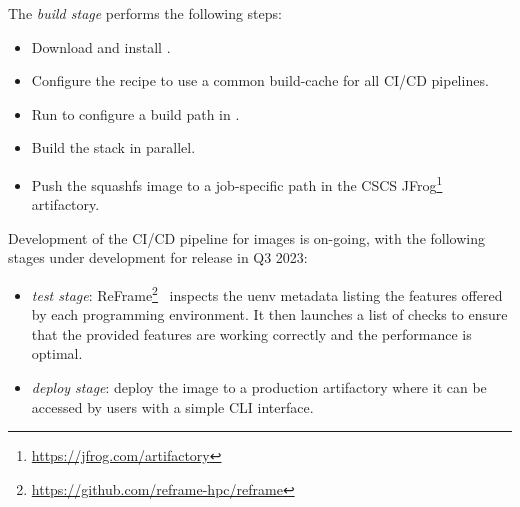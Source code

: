 The \emph{build stage} performs the following steps:
\begin{itemize}
    \item Download and install \stackinator.
    \item Configure the recipe to use a common build-cache for all CI/CD pipelines.
    \item Run \stackinator {} to configure a build path in .
    \item Build the stack in parallel.
    \item Push the squashfs image to a job-specific path in the CSCS JFrog\footnote{\url{https://jfrog.com/artifactory}} artifactory.
\end{itemize}

Development of the CI/CD pipeline for images is on-going, with the following stages under development for release in Q3 2023:
\begin{itemize}
     \item \emph{test stage}: ReFrame\footnote{\url{https://github.com/reframe-hpc/reframe}}~\cite{software:reframe} inspects the uenv metadata listing the features offered by each programming environment.
    It then launches a list of checks to ensure that the provided features are working correctly and the performance is optimal.
    \item \emph{deploy stage}: deploy the image to a production artifactory where it can be accessed by users with a simple CLI interface.
\end{itemize}

